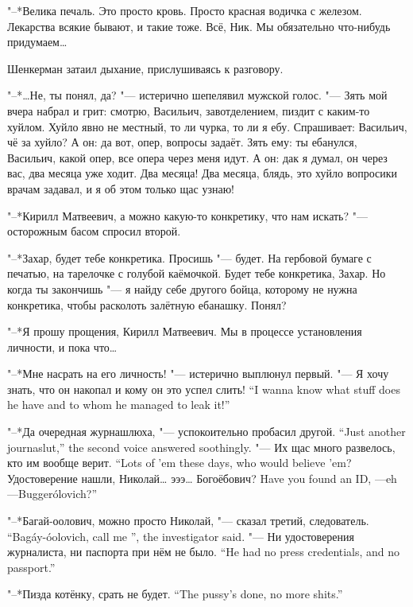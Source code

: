 "--*Велика печаль.
Это просто кровь.
Просто красная водичка с железом.
Лекарства всякие бывают, и такие тоже.
Всё, Ник.
Мы обязательно что-нибудь придумаем\ldots{}

\asterism

Шенкерман затаил дыхание, прислушиваясь к разговору.

"--*\ldots{}Не, ты понял, да? "--- истерично шепелявил мужской голос.
"--- Зять мой вчера набрал и грит: смотрю, Васильич, завотделением, пиздит с каким-то хуйлом.
Хуйло явно не местный, то ли чурка, то ли я ебу.
Спрашивает: Васильич, чё за хуйло?
А он: да вот, опер, вопросы задаёт.
Зять ему: ты ебанулся, Васильич, какой опер, все опера через меня идут.
А он: дак я думал, он через вас, два месяца уже ходит.
Два месяца!
Два месяца, блядь, это хуйло вопросики врачам задавал, и я об этом только щас узнаю!

"--*Кирилл Матвеевич, а можно какую-то конкретику, что нам искать? "--- осторожным басом спросил второй.

"--*Захар, будет тебе конкретика.
Просишь "--- будет.
На гербовой бумаге с печатью, на тарелочке с голубой каёмочкой.
Будет тебе конкретика, Захар.
Но когда ты закончишь "--- я найду себе другого бойца, которому не нужна конкретика, чтобы расколоть залётную ебанашку.
Понял?

"--*Я прошу прощения, Кирилл Матвеевич.
Мы в процессе установления личности, и пока что\ldots{}

"--*Мне насрать на его личность! "--- истерично выплюнул первый.
{"--- Я хочу знать, что он накопал и кому он это успел слить!}
{``I wanna know what stuff does he have and to whom he managed to leak it!''}

{"--*Да очередная журнашлюха, "--- успокоительно пробасил другой.}
{``Just another journaslut,'' the second voice answered soothingly.}
{"--- Их щас много развелось, кто им вообще верит.}
{``Lots of 'em these days, who would believe 'em?}
{Удостоверение нашли, Николай\ldots{} эээ\ldots{} Богоёбович?}
{Have you found an ID, \Nikolay---eh---Bugger\'olovich?''}

{"--*Багай-оолович, можно просто Николай, "--- сказал третий, следователь.}
{``Bag\'ay-\'oolovich, call me \Nikolay'', the investigator said.}
{"--- Ни удостоверения журналиста, ни паспорта при нём не было.}
{``He had no press credentials, and no passport.''}

{"--*Пизда котёнку, срать не будет.}
{``The pussy's done, no more shits.''}

